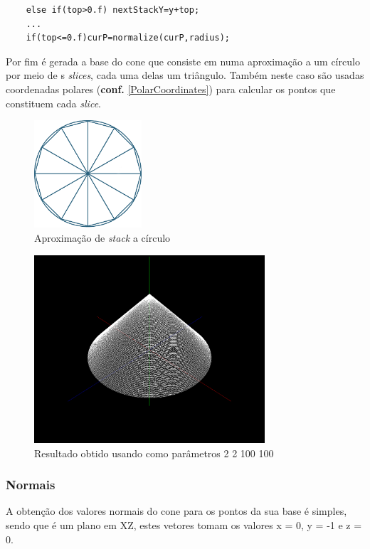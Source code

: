 \documentclass{article}
\begin{document}
\begin{Verbatim}
    else if(top>0.f) nextStackY=y+top;
    ...
    if(top<=0.f)curP=normalize(curP,radius);
\end{Verbatim}

Por fim é gerada a base do cone que consiste em numa aproximação a um círculo por meio de s \textit{slices}, cada uma delas um triângulo. Também neste caso são usadas coordenadas polares (\textbf{conf.} \ref{PolarCoordinates}) para calcular os pontos que constituem cada \textit{slice}.

\begin{figure}[H]
    \centering
    \includegraphics[height=4cm]{circleStack.png}
    \caption{Aproximação de \textit{stack} a círculo}
\end{figure}


\begin{figure}[H]
    \centering
    \includegraphics[height=7cm]{coneFinal.png}
    \caption{Resultado obtido usando como parâmetros 2 2 100 100} 
\end{figure}

\newpage

\subsubsection{Normais}
A obtenção dos valores normais do cone para os pontos da sua base é simples, sendo que é um plano em XZ, estes vetores tomam os valores x = 0, y = -1 e z = 0.
\end{document}
